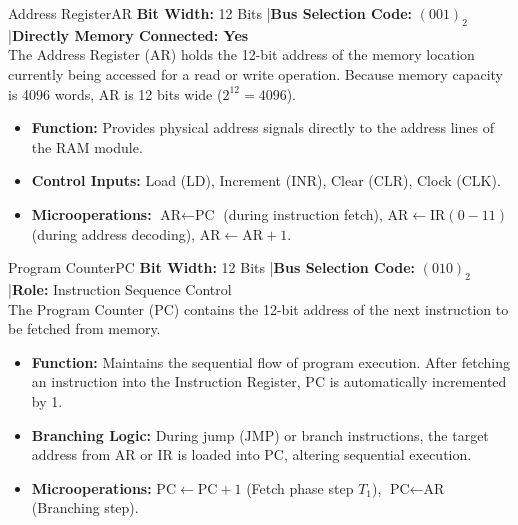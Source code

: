 \documentclass[11pt,a4paper]{article}
\begin{document}
\begin{registerbox}{Address Register}{AR}
\textbf{Bit Width:} 12 Bits \quad|\quad \textbf{Bus Selection Code:} $(001)_2$ \quad|\quad \textbf{Directly Memory Connected: Yes}\\[0.1cm]
The Address Register ($\text{AR}$) holds the 12-bit address of the memory location currently being accessed for a read or write operation. Because memory capacity is 4096 words, $\text{AR}$ is 12 bits wide ($2^{12} = 4096$). 
\begin{itemize}[noitemsep,topsep=2pt]
    \item \textbf{Function:} Provides physical address signals directly to the address lines of the RAM module.
    \item \textbf{Control Inputs:} Load ($\text{LD}$), Increment ($\text{INR}$), Clear ($\text{CLR}$), Clock ($\text{CLK}$).
    \item \textbf{Microoperations:} $\text{AR} \leftarrow \text{PC}$ (during instruction fetch), $\text{AR} \leftarrow \text{IR}(0-11)$ (during address decoding), $\text{AR} \leftarrow \text{AR} + 1$.
\end{itemize}
\end{registerbox}

\vspace{0.15cm}

\begin{registerbox}{Program Counter}{PC}
\textbf{Bit Width:} 12 Bits \quad|\quad \textbf{Bus Selection Code:} $(010)_2$ \quad|\quad \textbf{Role:} Instruction Sequence Control\\[0.1cm]
The Program Counter ($\text{PC}$) contains the 12-bit address of the next instruction to be fetched from memory.
\begin{itemize}[noitemsep,topsep=2pt]
    \item \textbf{Function:} Maintains the sequential flow of program execution. After fetching an instruction into the Instruction Register, $\text{PC}$ is automatically incremented by 1.
    \item \textbf{Branching Logic:} During jump ($\text{JMP}$) or branch instructions, the target address from $\text{AR}$ or $\text{IR}$ is loaded into $\text{PC}$, altering sequential execution.
    \item \textbf{Microoperations:} $\text{PC} \leftarrow \text{PC} + 1$ (Fetch phase step $T_1$), $\text{PC} \leftarrow \text{AR}$ (Branching step).
\end{itemize}
\end{registerbox}
\end{document}

